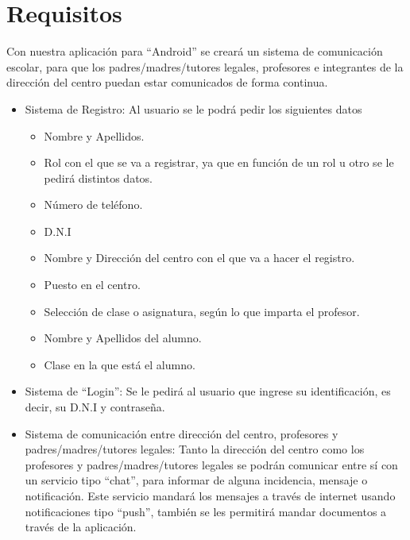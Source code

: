 %
%
%
%

\cleardoublepage
\chapter{Requisitos}
\label{chap:requirements}

Con nuestra aplicaci\'on para ``Android'' se crear\'a un sistema de comunicaci\'on escolar, para que los padres/madres/tutores legales, profesores e integrantes de la direcci\'on del centro puedan estar comunicados de forma continua.

\begin{itemize}
	\item Sistema de Registro: Al usuario se le podr\'a pedir los siguientes datos
		\begin{itemize}
			\item Nombre y Apellidos.
			\item Rol con el que se va a registrar, ya que en funci\'on de un rol u otro se le pedir\'a distintos datos.
			\item N\'umero de tel\'efono.
			\item D.N.I
			\item Nombre y Direcci\'on del centro con el que va a hacer el registro.
			\item Puesto en el centro.
			\item Selecci\'on de clase o asignatura, seg\'un lo que imparta el profesor.
			\item Nombre y Apellidos del alumno.
			\item Clase en la que est\'a el alumno. %
		\end{itemize}
	\item Sistema de ``Login'': Se le pedir\'a al usuario que ingrese su identificaci\'on, es decir, su D.N.I y contrase\~na.
	\item Sistema de comunicaci\'on entre direcci\'on del centro, profesores y padres/madres/tutores legales: Tanto la direcci\'on del centro como los profesores y padres/madres/tutores legales se podr\'an comunicar entre s\'i con un servicio tipo ``chat'', para informar de alguna incidencia, mensaje o notificaci\'on. Este servicio mandar\'a los mensajes a trav\'es de internet usando notificaciones tipo ``push'', tambi\'en se les permitir\'a mandar documentos a trav\'es de la aplicaci\'on.

\end{itemize}

